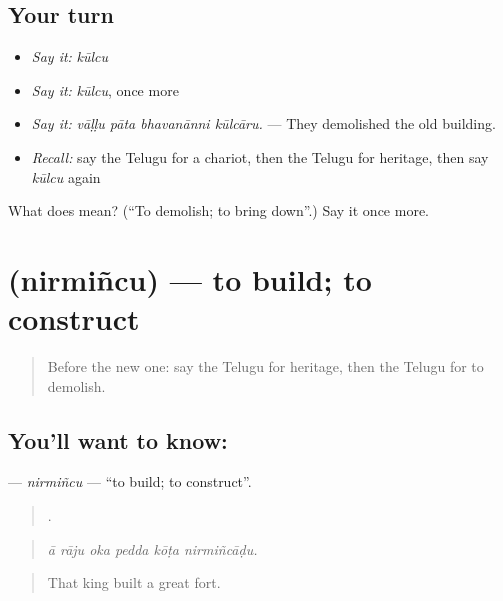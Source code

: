 \subsection*{Your turn}
\begin{itemize}
\raggedright
  \item \emph{Say it:} \emph{kūlcu}
  \item \emph{Say it:} \emph{kūlcu}, once more
  \item \emph{Say it:} \emph{vāḷḷu pāta bhavanānni kūlcāru.} — They demolished the old building.
  \item \emph{Recall:} say the Telugu for a chariot, then the Telugu for heritage, then say \emph{kūlcu} again
\end{itemize}

\begin{tcolorbox}[breakable,colback=teal!4,colframe=teal!35!black,title={Before you move on}]
What does  mean? (\textquotedblleft{}To demolish; to bring down\textquotedblright{}.) Say it once more.
\end{tcolorbox}
\section[\texorpdfstring{\te{నిర్మించు} (nirmiñcu)}{నిర్మించు (nirmiñcu)}]{ (nirmiñcu) — to build; to construct}

\label{lesson:TE-C369-nirmincu}



\begin{quote}
Before the new one: say the Telugu for heritage, then the Telugu for to demolish.
\end{quote}

\subsection*{You'll want to know: }
\textbf{} — \emph{nirmiñcu} — \textquotedblleft{}to build; to construct\textquotedblright{}.

\begin{quote}
     .
\end{quote}

\begin{quote}
\emph{ā rāju oka pedda kōṭa nirmiñcāḍu.}
\end{quote}

\begin{quote}
That king built a great fort.
\end{quote}

